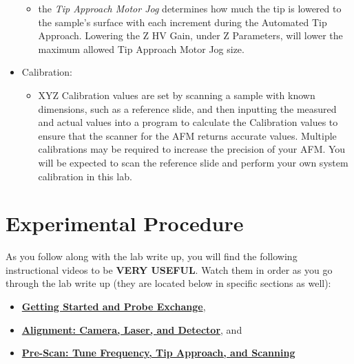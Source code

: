 \documentclass{../lab}
\begin{document}
\begin{itemize}
\begin{itemize}
        \item the \emph{Tip Approach Motor Jog} determines how much the tip is lowered to the sample's surface with each increment during the Automated Tip Approach.  Lowering the Z HV Gain, under Z Parameters, will lower the maximum allowed Tip Approach Motor Jog size.

    \end{itemize}

    \item Calibration:

    \begin{itemize}
        \item XYZ Calibration values are set by scanning a sample with known dimensions, such as a reference slide, and then inputting the measured and actual values into a program to calculate the Calibration values to ensure that the scanner for the AFM returns accurate values. Multiple calibrations may be required to increase the precision of your AFM. You will be expected to scan the reference slide and perform your own system calibration in this lab.

    \end{itemize}

\end{itemize}

\section{Experimental Procedure}

As you follow along with the lab write up, you will find the following instructional videos to be \textbf{VERY USEFUL}. Watch them in order as you go through the lab write up (they are located below in specific sections as well):

\begin{itemize}
    \item \href{http://experimentationlab.berkeley.edu/sites/default/files/gettingstarted\_final2.mp4}{\textbf{Getting Started and Probe Exchange}},

    \item \href{http://experimentationlab.berkeley.edu/sites/default/files/alignment\_final2.mp4}{\textbf{Alignment: Camera, Laser, and Detector}}, and

    \item \href{http://experimentationlab.berkeley.edu/sites/default/files/prescan\_final2.mp4}{\textbf{Pre-Scan: Tune Frequency, Tip Approach, and Scanning}}

\end{itemize}
\end{document}

